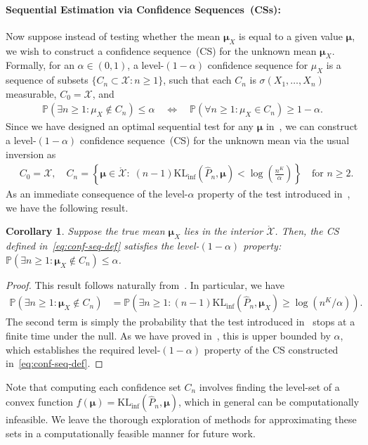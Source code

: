 \documentclass{article}
\theoremstyle{plain}
\newtheorem{corollary}[corollary]{Corollary}
\theoremstyle{definition}
\newcommand{\lrp}[1]{\left( #1 \right)}
\newcommand{\KLinf}{\operatorname{KL_{inf}}}
\newcommand{\calX}{\mathcal X}
\newcommand{\boldmu}{\boldsymbol{\mu}}
\begin{document}
\paragraph{Sequential Estimation via Confidence Sequences~(CSs):} Now suppose instead of testing whether the mean $\boldmu_X$ is equal to a given value $\boldmu$, we wish to construct a confidence sequence~(CS) for the unknown mean $\boldmu_X$. Formally, for an $\alpha \in (0,1)$, a level-$(1-\alpha)$ confidence sequence for $\mu_X$ is a sequence of subsets $\{C_n \subset \calX: n \geq 1\}$, such that each $C_n$  is $\sigma(X_1, \ldots, X_n)$ measurable, $C_0 = \calX$, and 
\begin{align}
    \mathbb{P}(\exists n \geq 1: \mu_X \not \in C_n) \leq \alpha \quad \iff \quad \mathbb{P}(\forall n \geq 1: \mu_X \in C_n) \geq 1-\alpha. 
\end{align}
Since we have designed an optimal sequential test for any $\boldmu$ in~,  we can construct a level-$(1-\alpha)$ confidence sequence~(CS) for the unknown mean via the usual inversion as  
\begin{align}
    &C_0 = \calX, \quad C_n= \left\{ \boldmu \in \mathring{\calX}: \; (n-1)\KLinf(\widehat{P}_n, \boldmu) < \log\lrp{\frac{n^K}{\alpha}} \right\} \quad \text{for } n \geq 2. \label{eq:conf-seq-def}
\end{align}
As an immediate consequence of the level-$\alpha$ property of the test introduced in~, we have the following result. 
\begin{corollary}
    \label{corollary:conf-seq} Suppose the true mean $\boldmu_X$ lies in the interior $\mathring{\calX}$. Then, the CS defined in~\eqref{eq:conf-seq-def} satisfies the level-$(1-\alpha)$ property:~ 
        $\mathbb{P}(\exists n \geq 1: \boldmu_X \not \in C_n) \leq \alpha$. 
\end{corollary}
\begin{proof}
This result  follows naturally from~. In particular, we have 
\begin{align}
    \mathbb{P}\left( \exists n \geq 1: \boldmu_X \not \in C_n \right)  & =     \mathbb{P}\left( \exists n \geq 1: (n-1) \KLinf(\widehat{P}_n, \boldmu_X) \geq \log(n^K/\alpha) \right). 
\end{align}
The second term is simply the probability that the test introduced in~ stops at a finite time under the null. As we have proved in~, this is upper bounded by $\alpha$, which establishes the required level-$(1-\alpha)$ property of the CS constructed in~\eqref{eq:conf-seq-def}. 
\end{proof}
Note that computing each confidence set $C_n$ involves finding the level-set of a convex function $f(\boldmu) = \KLinf(\widehat{P}_n, \boldmu)$, which in general can be computationally infeasible. We leave the thorough exploration of methods for approximating these sets in a computationally feasible manner for future work. 
\end{document}
